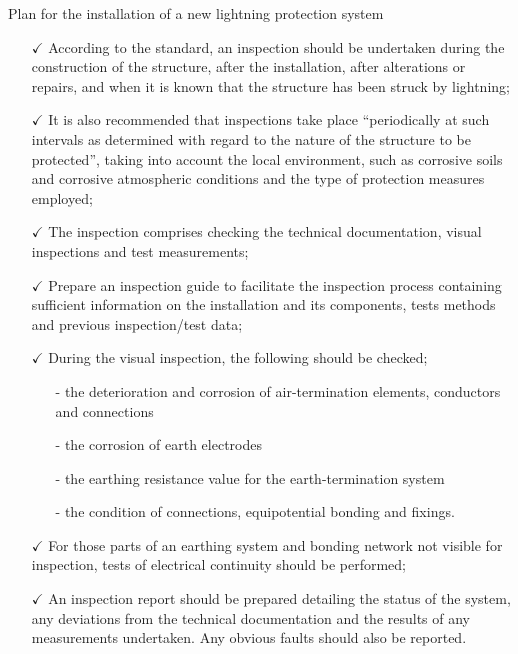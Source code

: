 Plan for the installation of a new lightning protection system 
\begin{itemize}%
	\item [$\checkmark$] According to the standard, an inspection should be undertaken during the construction of the structure, after the installation, after alterations or repairs, and when it is known that the structure has been struck by lightning;
	\item [$\checkmark$] It is also recommended that inspections take place “periodically at such intervals as determined with regard to the nature of the structure to be protected”, taking into account the local environment, such as corrosive soils and corrosive atmospheric conditions and the type of protection measures employed;
	\item [$\checkmark$]The inspection comprises checking the technical documentation, visual inspections and test measurements;
	\item [$\checkmark$]Prepare an inspection guide to facilitate the inspection process containing sufficient information on the installation and its components, tests methods and previous inspection/test data;	
	\item [$\checkmark$]During the visual inspection, the following should be checked;	
	\begin{itemize}
		\item [-] the deterioration and corrosion of air-termination elements, conductors and connections
		\item [-]	the corrosion of earth electrodes
		\item [-]	the earthing resistance value for the earth-termination system
		\item [-]	the condition of connections, equipotential bonding and fixings.
		
	\end{itemize}
	
	\item [$\checkmark$] For those parts of an earthing system and bonding network not visible for inspection, tests of electrical continuity should be performed;
	
	\item [$\checkmark$] An inspection report should be prepared detailing the status of the system, any deviations from the technical documentation and the results of any measurements undertaken. Any obvious faults should also be reported.
\end{itemize}

